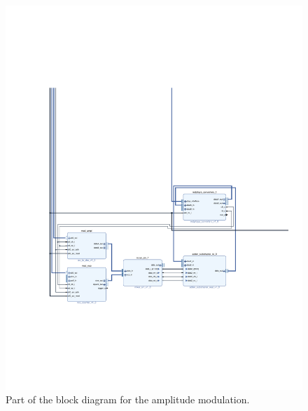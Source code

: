 \documentclass[12pt,oneside]{article}
\begin{document}
\begin{figure}[h!tb]
	\begin{center}
		\includegraphics[width=16cm,trim={3cm 6cm 4cm 13cm}, clip]{design/mod_ampl.pdf}
		\caption{Part of the block diagram for the amplitude modulation.}
		\label{fig:mod_ampl}
	\end{center}
\end{figure}
\end{document}
